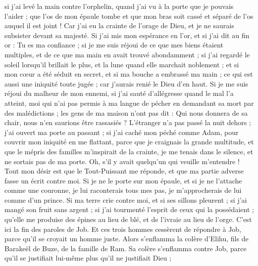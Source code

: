 \begin{multicols}{2}
si j'ai levé la main contre l'orphelin, quand j'ai vu à la porte que je pouvais l'aider ;
que l'os de mon épaule tombe et que mon bras soit cassé et séparé de l'os auquel il est joint !
Car j'ai eu la crainte de l'orage de Dieu, et je ne saurais subsister devant sa majesté. 
Si j'ai mis mon espérance en l'or, et si j'ai dit au fin or : Tu es ma confiance ;
si je me suis réjoui de ce que mes biens étaient multiples, et de ce que ma main en avait trouvé abondamment ;
si j'ai regardé le soleil lorsqu'il brillait le plus, et la lune quand elle marchait noblement ;
et si mon cœur a été séduit en secret, et si ma bouche a embrassé ma main ; 
ce qui est aussi une iniquité toute jugée ; car j'aurais renié le Dieu d'en haut.
Si je me suis réjoui du malheur de mon ennemi, si j'ai sauté d'allégresse quand le mal l'a atteint,
moi qui n'ai pas permis à ma langue de pécher en demandant sa mort par des malédictions ;
les gens de ma maison n'ont pas dit : Qui nous donnera de sa chair, nous n'en saurions être rassasiés ?
L'étranger n'a pas passé la nuit dehors ; j'ai ouvert ma porte au passant ;
si j'ai caché mon péché comme Adam, pour couvrir mon iniquité en me flattant,
parce que je craignais la grande multitude, et que le mépris des familles m'inspirait de la crainte, je me tenais dans le silence, et ne sortais pas de ma porte.
Oh, s'il y avait quelqu'un qui veuille m'entendre ! Tout mon désir est que le Tout-Puissant me réponde, et que ma partie adverse fasse un écrit contre moi.
Si je ne le porte sur mon épaule, et si je ne l'attache comme une couronne,
je lui raconterais tous mes pas, je m'approcherais de lui comme d'un prince.
Si ma terre crie contre moi, et si ses sillons pleurent ;
si j'ai mangé son fruit sans argent ; si j'ai tourmenté l'esprit de ceux qui la possédaient ;
qu'elle me produise des épines au lieu de blé, et de l'ivraie au lieu de l'orge. C'est ici la fin des paroles de Job.
\VerseOne{}Et ces trois hommes cessèrent de répondre à Job, parce qu'il se croyait un homme juste. 
Alors s'enflamma la colère d'Elihu, fils de Barakeël de Buze, de la famille de Ram. Sa colère s'enflamma contre Job, parce qu'il se justifiait lui-même plus qu'il ne justifiait Dieu ; 

\end{multicols}
